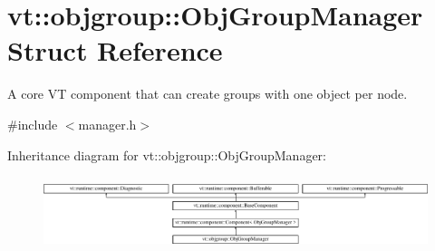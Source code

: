 \hypertarget{structvt_1_1objgroup_1_1_obj_group_manager}{}\section{vt\+:\+:objgroup\+:\+:Obj\+Group\+Manager Struct Reference}
\label{structvt_1_1objgroup_1_1_obj_group_manager}


A core VT component that can create groups with one object per node.  




{\ttfamily \#include $<$manager.\+h$>$}

Inheritance diagram for vt\+:\+:objgroup\+:\+:Obj\+Group\+Manager\+:\begin{figure}[H]
\begin{center}
\leavevmode
\includegraphics[height=2.176871cm]{structvt_1_1objgroup_1_1_obj_group_manager}
\end{center}
\end{figure}

